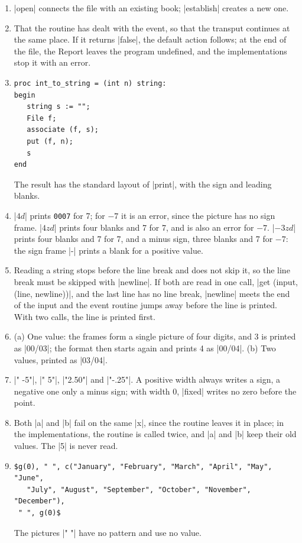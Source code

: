\begin{enumerate}
\item \code|open| connects the file with an existing book;
  \code|establish| creates a new one.
\item That the routine has dealt with the event, so that the transput
  continues at the same place. If it returns \code|false|, the default
  action follows; at the end of the file, the Report leaves the program
  undefined, and the implementations stop it with an error.
\item
\begin{lstlisting}
proc int_to_string = (int n) string:
begin
   string s := "";
   File f;
   associate (f, s);
   put (f, n);
   s
end
\end{lstlisting}
  The result has the standard layout of \code|print|, with the sign and
  leading blanks.
\item \code|$4d$| prints \texttt{0007} for 7; for $-7$ it is an error,
  since the picture has no sign frame. \code|$4zd$| prints four blanks
  and 7 for 7, and is also an error for $-7$. \code|$-3zd$| prints four
  blanks and 7 for 7, and a minus sign, three blanks and 7 for $-7$: the
  sign frame \code|-| prints a blank for a positive value.
\item Reading a string stops before the line break and does not skip it,
  so the line break must be skipped with \code|newline|. If both are read
  in one call, \code|get (input, (line, newline))|, and the last line has
  no line break, \code|newline| meets the end of the input and the event
  routine jumps away before the line is printed. With two calls, the line
  is printed first.
\item (a) One value: the frames form a single picture of four digits,
  and 3 is printed as \code|00/03|; the format then starts again and
  prints 4 as \code|00/04|. (b) Two values, printed as
  \code|03/04|.
\item \code|" -5"|, \code|"  5"|, \code|"2.50"| and \code|"-.25"|.
  A positive width always writes a sign, a negative one only a minus
  sign; with width 0, \code|fixed| writes no zero before the point.
\item Both \code|a| and \code|b| fail on the same \code|x|, since the
  routine leaves it in place; in the implementations, the routine is
  called twice, and \code|a| and \code|b| keep their old values. The
  \code|5| is never read.
\item
\begin{lstlisting}
$g(0), " ", c("January", "February", "March", "April", "May", "June",
   "July", "August", "September", "October", "November", "December"),
 " ", g(0)$
\end{lstlisting}
  The pictures \code|" "| have no pattern and use no value.
\end{enumerate}
